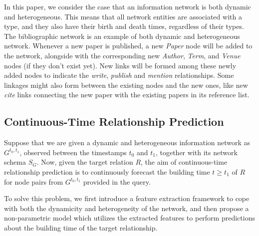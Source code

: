 In this paper, we consider the case that an information network is both dynamic and heterogeneous. This means that all network entities are associated with a type, and they also have their birth and death times, regardless of their types. The bibliographic network is an example of both dynamic and heterogeneous network. Whenever a new paper is published, a new \emph{Paper} node will be added to the network, alongside with the corresponding new \emph{Author}, \emph{Term}, and \emph{Venue} nodes (if they don't exist yet). New links will be formed among these newly added nodes to indicate the \textit{write}, \textit{publish} and \textit{mention} relationships. Some linkages might also form between the existing nodes and the new ones, like new \textit{cite} links connecting the new paper with the existing papers in its reference list.

\subsection{Continuous-Time Relationship Prediction}
Suppose that we are given a dynamic and heterogeneous information network as $G^{t_0,t_1}$, observed between the timestamps $t_0$ and $t_1$, together with its network schema $S_G$. Now, given the target relation $R$, the aim of continuous-time relationship prediction is to continuously forecast the building time $t\ge t_1$ of $R$ for node pairs from $G^{t_0, t_1}$ provided in the query.

To solve this problem, we first introduce a feature extraction framework to cope with both the dynamicity and heterogeneity of the network, and then propose a non-parametric model which utilizes the extracted features to perform predictions about the building time of the target relationship.

